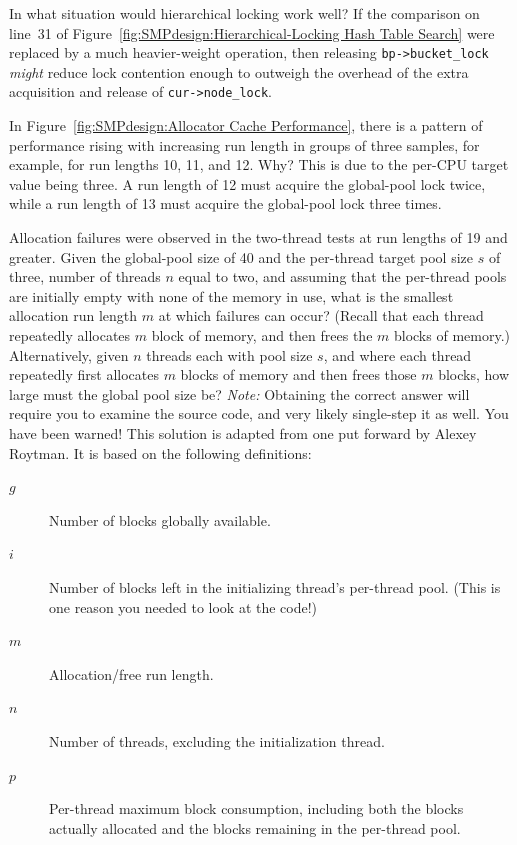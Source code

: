 \begin{enumerate}
\QuickQ{}
	In what situation would hierarchical locking work well?
\QuickA{}
	If the comparison on line~31 of
	Figure~\ref{fig:SMPdesign:Hierarchical-Locking Hash Table Search}
	were replaced by a much heavier-weight operation,
	then releasing {\tt bp->bucket\_lock} \emph{might} reduce lock
	contention enough to outweigh the overhead of the extra
	acquisition and release of {\tt cur->node\_lock}.

\QuickQ{}
	In Figure~\ref{fig:SMPdesign:Allocator Cache Performance},
	there is a pattern of performance rising with increasing run
	length in groups of three samples, for example, for run lengths
	10, 11, and 12.
	Why?
\QuickA{}
	This is due to the per-CPU target value being three.
	A run length of 12 must acquire the global-pool lock twice,
	while a run length of 13 must acquire the global-pool lock
	three times.

\QuickQ{}
	Allocation failures were observed in the two-thread
	tests at run lengths of 19 and greater.
	Given the global-pool size of 40 and the per-thread target
	pool size $s$ of three, number of threads $n$ equal to two,
	and assuming that the per-thread pools are initially
	empty with none of the memory in use, what is the smallest allocation
	run length $m$ at which failures can occur?
	(Recall that each thread repeatedly allocates $m$ block of memory,
	and then frees the $m$ blocks of memory.)
	Alternatively, given $n$ threads each with pool size $s$, and
	where each thread repeatedly first allocates $m$ blocks of memory
	and then frees those $m$ blocks, how large must the global pool
	size be?
	\emph{Note:} Obtaining the correct answer will require you to
	examine the  source code, and very likely
	single-step it as well.
	You have been warned!
\QuickA{}
	This solution is adapted from one put forward by Alexey Roytman.
	It is based on the following definitions:

	\begin{description}
	\item[$g$]	Number of blocks globally available.
	\item[$i$]	Number of blocks left in the initializing thread's
			per-thread pool.  (This is one reason you needed
			to look at the code!)
	\item[$m$]	Allocation/free run length.
	\item[$n$]	Number of threads, excluding the initialization thread.
	\item[$p$]	Per-thread maximum block consumption, including
			both the blocks actually allocated and the blocks
			remaining in the per-thread pool.
	\end{description}


\end{enumerate}
